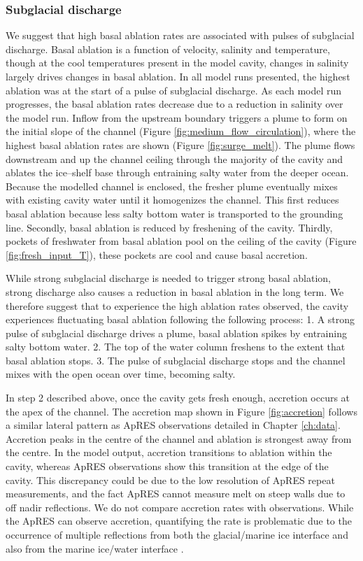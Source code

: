 \subsubsection{Subglacial discharge} \label{sec:ocean_pulse}
We suggest that high basal ablation rates are associated with pulses of subglacial discharge.  Basal ablation is a function of velocity, salinity and temperature, though at the cool temperatures present in the model cavity, changes in salinity largely drives changes in basal ablation.  
In all model runs presented, the highest ablation was at the start of a pulse of subglacial discharge. As each model run progresses, the basal ablation rates decrease due to a reduction in salinity over the model run. 
Inflow from the upstream boundary triggers a plume to form on the initial slope of the channel (Figure \ref{fig:medium_flow_circulation}), where the highest basal ablation rates are shown (Figure \ref{fig:surge_melt}). The plume flows downstream and up the channel ceiling through the majority of the cavity and ablates the ice--shelf base through entraining salty water from the deeper ocean. Because the modelled channel is enclosed, the fresher plume eventually mixes with existing cavity water until it homogenizes the channel. This first reduces basal ablation because less salty bottom water is transported to the grounding line. Secondly, basal ablation is reduced by freshening of the cavity.  Thirdly, pockets of freshwater from basal ablation pool on the ceiling of the cavity (Figure \ref{fig:fresh_input_T}), these pockets are cool and cause basal accretion.

While strong subglacial discharge is needed to trigger strong basal ablation, strong discharge also causes a reduction in basal ablation in the long term. We therefore suggest that to experience the high ablation rates observed, the cavity experiences fluctuating basal ablation following the following process: 1. A strong pulse of subglacial discharge drives a plume, basal ablation spikes by entraining salty bottom water. 2. The top of the water column freshens to the extent that basal ablation stops.  3. The pulse of subglacial discharge stops and the channel mixes with the open ocean over time, becoming salty.

In step 2 described above, once the cavity gets fresh enough, accretion occurs at the apex of the channel. The accretion map shown in Figure \ref{fig:accretion} follows a similar lateral pattern as ApRES observations detailed in Chapter \ref{ch:data}. 
Accretion peaks in the centre of the channel and ablation is strongest away from the centre. In the model output, accretion transitions to ablation within the cavity, whereas ApRES observations show this transition at the edge of the cavity.
This discrepancy could be due to the low resolution of ApRES repeat measurements, and the fact ApRES cannot measure melt on steep walls due to off nadir reflections. We do not compare accretion rates with observations. While the ApRES can observe accretion, quantifying the rate is problematic due to the occurrence of multiple reflections from both the glacial/marine ice interface and also from the marine ice/water interface \citep{craig_personal_comm}.


